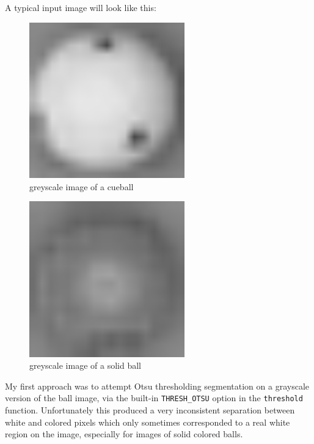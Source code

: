 A typical input image will look like this:
\begin{figure}
  \includegraphics[width=0.6\textwidth]{./imgs/cueball_grey.png}
  \caption{greyscale image of a cueball}
\end{figure}
\begin{figure}
  \includegraphics[width=0.6\textwidth]{./imgs/difficult_solid.png}
  \caption{greyscale image of a solid ball}
\end{figure}

My first approach was to attempt Otsu thresholding segmentation
on a grayscale version of the ball image, 
via the built-in \verb|THRESH_OTSU| option in the \verb|threshold| function.
Unfortunately this produced a very inconsistent separation between white and 
colored pixels which only sometimes corresponded to a real white region 
on the image, especially for images of solid colored balls.

